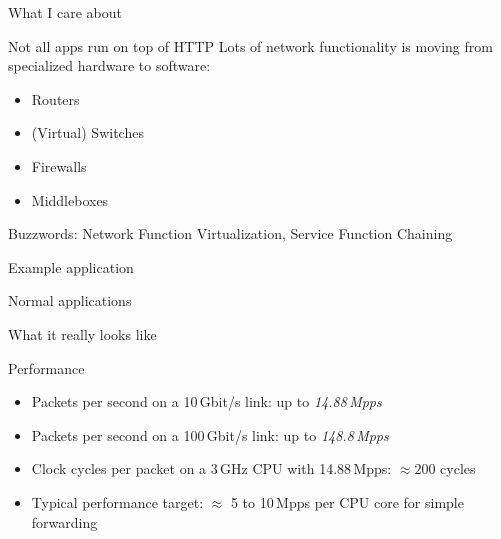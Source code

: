 \documentclass[NET,english,aspectratio=169,notitleframe]{tumbeamer}
\begin{document}
\begin{frame}{What I care about}
\centering{}
\end{frame}


\begin{frame}{Not all apps run on top of HTTP}
Lots of network functionality is moving from specialized hardware to software:
\begin{itemize}
\item Routers
\item (Virtual) Switches
\item Firewalls
\item Middleboxes
\end{itemize}
Buzzwords: Network Function Virtualization, Service Function Chaining
\end{frame}

\begin{frame}{Example application}
\centering
\end{frame}


\begin{frame}{Normal applications}
\centering
\end{frame}

\begin{frame}{What it really looks like}
\centering
\end{frame}

\begin{frame}{Performance}
\begin{itemize}
\item Packets per second on a 10\,Gbit/s link: up to \emph{14.88\,Mpps}
\item<2-> Packets per second on a 100\,Gbit/s link: up to \emph{148.8\,Mpps}
\item<3-> Clock cycles per packet on a 3\,GHz CPU with 14.88\,Mpps: $\approx 200$ cycles
\item<3-> Typical performance target: $\approx$ 5 to 10\,Mpps per CPU core for simple forwarding
\end{itemize}
\end{frame}
\end{document}
